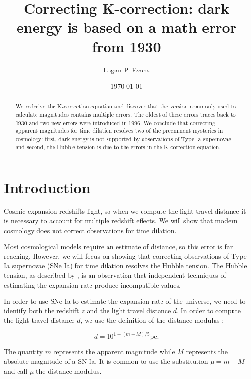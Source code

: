 \documentclass[aps,prl,reprint,amsmath,floatfix]{revtex4-2}
\begin{document}
\title{Correcting K-correction: dark energy is based on a math error from 1930}

\author{Logan P. Evans}
 \noaffiliation

\date{\today}

\begin{abstract}
We rederive the K-correction equation and discover that the version commonly
used to calculate magnitudes contains multiple errors. The oldest of these
errors traces back to 1930 and two new errors were introduced in 1996. We
conclude that correcting apparent magnitudes for time dilation resolves two of
the preeminent mysteries in cosmology: first, dark energy is not supported by
observations of Type Ia supernovae and second, the Hubble tension is due to the
errors in the K-correction equation.
\end{abstract}

\maketitle

\section{Introduction}

Cosmic expansion redshifts light, so when we compute the light travel distance
it is necessary to account for multiple redshift effects. We will show that
modern cosmology does not correct observations for time dilation.

Most cosmological models require an estimate of distance, so this error is far
reaching. However, we will focus on showing that correcting observations of
Type Ia supernovae (SNe Ia) for time dilation resolves the Hubble tension. The
Hubble tension, as described by \citet{verde2019}, is an observation that
independent techniques of estimating the expansion rate produce incompatible
values.

In order to use SNe Ia to estimate the expansion rate of the universe, we need to
identify both the redshift $z$ and the light travel distance $d$. In order to
compute the light travel distance $d$, we use the definition of the distance
modulus \citep{weinberg2008}:

\begin{equation}
\label{eq:mu_def}
  d = 10^{1 + (m - M)/5} \text{pc}.
\end{equation}

\noindent The quantity $m$ represents the apparent magnitude while $M$
represents the absolute magnitude of a SN Ia. It is common to use the
substitution $\mu = m - M$ and call $\mu$ the distance modulus.
\end{document}
